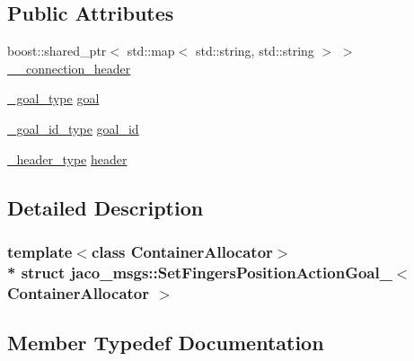 \subsection*{Public Attributes}
\begin{DoxyCompactItemize}
\item 
boost\+::shared\+\_\+ptr$<$ std\+::map$<$ std\+::string, std\+::string $>$ $>$ \hyperlink{structjaco__msgs_1_1SetFingersPositionActionGoal___ae57aa2806a4f343549b702bd68d15065}{\+\_\+\+\_\+connection\+\_\+header}
\item 
\hyperlink{structjaco__msgs_1_1SetFingersPositionActionGoal___a6221e777345b9fb8eba1888205ac5c25}{\+\_\+goal\+\_\+type} \hyperlink{structjaco__msgs_1_1SetFingersPositionActionGoal___a813e7ec249b22368dc97bde83fa86fb0}{goal}
\item 
\hyperlink{structjaco__msgs_1_1SetFingersPositionActionGoal___abbed6c9e246b67002f6688488b9194cf}{\+\_\+goal\+\_\+id\+\_\+type} \hyperlink{structjaco__msgs_1_1SetFingersPositionActionGoal___a261bcecfa80d718de47ac2c4c3a479fb}{goal\+\_\+id}
\item 
\hyperlink{structjaco__msgs_1_1SetFingersPositionActionGoal___aeee4ff5a362ba3a4fcf0f858f5c9ec85}{\+\_\+header\+\_\+type} \hyperlink{structjaco__msgs_1_1SetFingersPositionActionGoal___aaaa32a1863202d0223d4e50696b4c64b}{header}
\end{DoxyCompactItemize}


\subsection{Detailed Description}
\subsubsection*{template$<$class Container\+Allocator$>$\\*
struct jaco\+\_\+msgs\+::\+Set\+Fingers\+Position\+Action\+Goal\+\_\+$<$ Container\+Allocator $>$}



\subsection{Member Typedef Documentation}
